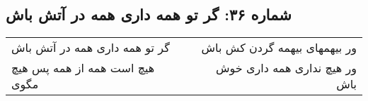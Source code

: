 \begin{center}
\section*{شماره ۳۶: گر تو همه داری همه در آتش باش}
\label{sec:036}
\begin{longtable}{l p{0.5cm} r}
گر تو همه داری همه در آتش باش
&&
ور بیهمهای بیهمه گردن کش باش
\\
هیچ است همه از همه پس هیچ مگوی
&&
ور هیچ نداری همه داری خوش باش
\\
\end{longtable}
\end{center}
